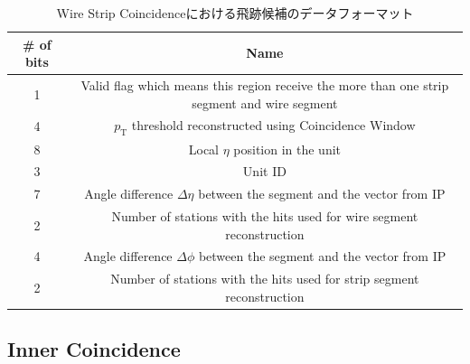 \begin{table}[]
    \centering
    \caption{Wire Strip Coincidenceにおける飛跡候補のデータフォーマット}
    \label{tab:WS}
    \begin{tabular}{|c|c|}
    \hline
    \# of bits & Name                                                                                        \\ \hline\hline
    1          & Valid flag which means this region receive the more than one strip segment and wire segment \\ \hline
    4          & $p_{\mathrm{T}}$ threshold reconstructed using Coincidence Window                           \\ \hline
    8          & Local $\eta$ position in the unit                                                           \\ \hline
    3          & Unit ID                                                                                     \\ \hline
    7          & Angle difference $\Delta\eta$ between the segment and the vector from IP                    \\ \hline
    2          & Number of stations with the hits used for wire segment reconstruction                       \\ \hline
    4          & Angle difference $\Delta\phi$ between the segment and the vector from IP                    \\ \hline
    2          & Number of stations with the hits used for strip segment reconstruction                      \\ \hline
    \end{tabular}
\end{table}

\subsection{Inner Coincidence}
